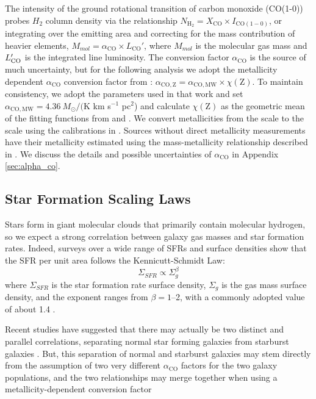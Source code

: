 \documentclass[a4paper,fleqn,usenatbib]{mnras}
\newcommand{\lco}{L'_{\rm{CO}}}
\newcommand{\aco}{\alpha_{\mathrm{CO}}}
\begin{document}
The intensity of the ground rotational transition of carbon monoxide (CO(1-0)) probes $H_{2}$ column density via the relationship $N_{\mathrm{H}_{2}} = X_{\mathrm{CO}} \times I_{\mathrm{CO(1-0)}}$, or integrating over the emitting area and correcting for the mass contribution of heavier elements, $M_{mol} = \aco \times L_{\mathrm{CO}}'$, where $M_{mol}$ is the molecular gas mass and $\lco$ is the integrated line luminosity.  The conversion factor $\aco$ is the source of much uncertainty, but for the following analysis we adopt the metallicity dependent $\aco$ conversion factor from \citet{2015ApJ...800...20G}: $\alpha_{\mathrm{CO, Z}} = \alpha_{\mathrm{CO, MW}} \times \chi(\mathrm{Z})$. To maintain consistency, we adopt the parameters used in that work and set $\alpha_{\mathrm{CO, MW}} = 4.36~M_{\odot}/($K km s$^{-1}$ pc$^{2}$) and calculate $\chi(\mathrm{Z})$ as the geometric mean of the fitting functions from \citet{2013ARA&A..51..207B} and \citet{2012ApJ...746...69G}.  We convert metallicities from the \citet{2004ApJ...617..240K} scale to the \citet{2004MNRAS.348L..59P} scale using the calibrations in \citet{2008ApJ...681.1183K}. Sources without direct metallicity measurements have their metallicity estimated using the mass-metallicity relationship described in \citet{2015ApJ...800...20G}. We discuss the details and possible uncertainties of $\aco$ in Appendix \ref{sec:alpha_co}. 

\subsection{Star Formation Scaling Laws}

Stars form in giant molecular clouds that primarily contain molecular hydrogen, so we expect a strong correlation between galaxy gas masses and star formation rates. Indeed, surveys over a wide range of SFRs and surface densities show that the SFR per unit area follows the Kennicutt-Schmidt Law: 
\begin{equation}
\Sigma_{SFR} \propto \Sigma_{g}^{\beta}
\end{equation}
where $\Sigma_{SFR}$ is the star formation rate surface density, $\Sigma_{g}$ is the gas mass surface density, and the exponent ranges from $\beta = 1$--2, with a commonly adopted value of about 1.4 \citep{2012ARA&A..50..531K,2012ApJ...754....2S,2013AJ....146...19L}.

Recent studies have suggested that there may actually be two distinct and parallel correlations, separating normal star forming galaxies from starburst galaxies \citep{2007ApJ...671..303B,2010ApJ...714L.118D,2010MNRAS.407.2091G,2015ApJ...812L..23S}. But, this separation of normal and starburst galaxies may stem directly from the assumption of two very different $\aco$ factors for the two galaxy populations, and the two relationships may merge together when using a metallicity-dependent conversion factor \cite[e.g.][]{2011MNRAS.418..664N}
 
\end{document}
